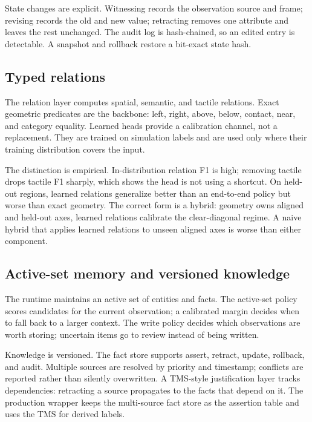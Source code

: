 \documentclass[10pt]{article}
\begin{document}
State changes are explicit. Witnessing records the observation source and
frame; revising records the old and new value; retracting removes one attribute
and leaves the rest unchanged. The audit log is hash-chained, so an edited entry
is detectable. A snapshot and rollback restore a bit-exact state hash.

\subsection{Typed relations}

The relation layer computes spatial, semantic, and tactile relations. Exact
geometric predicates are the backbone: left, right, above, below, contact, near,
and category equality. Learned heads provide a calibration channel, not a
replacement. They are trained on simulation labels and are used only where their
training distribution covers the input.

The distinction is empirical. In-distribution relation F1 is high; removing
tactile drops tactile F1 sharply, which shows the head is not using a shortcut.
On held-out regions, learned relations generalize better than an end-to-end
policy but worse than exact geometry. The correct form is a hybrid: geometry
owns aligned and held-out axes, learned relations calibrate the clear-diagonal
regime. A naive hybrid that applies learned relations to unseen aligned axes is
worse than either component.

\subsection{Active-set memory and versioned knowledge}

The runtime maintains an active set of entities and facts. The active-set
policy scores candidates for the current observation; a calibrated margin
decides when to fall back to a larger context. The write policy decides which
observations are worth storing; uncertain items go to review instead of being
written.

Knowledge is versioned. The fact store supports assert, retract, update,
rollback, and audit. Multiple sources are resolved by priority and timestamp;
conflicts are reported rather than silently overwritten. A TMS-style
justification layer tracks dependencies: retracting a source propagates to the
facts that depend on it. The production wrapper keeps the multi-source fact
store as the assertion table and uses the TMS for derived labels.
\end{document}
